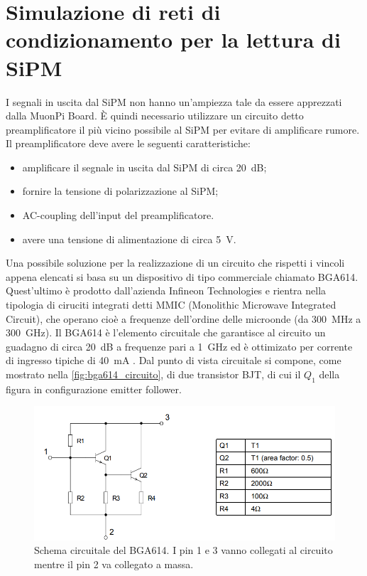 \chapter[Simulazione del preamplificatore]{Simulazione di reti di condizionamento per la lettura di SiPM}
I segnali in uscita dal SiPM non hanno un'ampiezza tale da essere apprezzati dalla MuonPi Board. È quindi necessario utilizzare un circuito detto 
preamplificatore il più vicino possibile al SiPM per evitare di amplificare rumore. Il preamplificatore deve avere le seguenti caratteristiche:
\begin{itemize}
    \item amplificare il segnale in uscita dal SiPM di circa \SI{20}{\dB};
    \item fornire la tensione di polarizzazione al SiPM;
    \item AC-coupling dell'input del preamplificatore.
    \item avere una tensione di alimentazione di circa \SI{5}{\volt}.
\end{itemize}\cite{muonpiwikicontributors_2017_sipm}
Una possibile soluzione per la realizzazione di un circuito che rispetti i vincoli appena elencati si basa su un dispositivo di tipo commerciale chiamato 
BGA614. Quest'ultimo è prodotto dall'azienda Infineon Technologies e rientra nella tipologia di ciruciti integrati detti MMIC (Monolithic 
Microwave Integrated Circuit), che operano cioè a frequenze dell'ordine delle microonde (da \SI{300}{\mega\hertz} a \SI{300}{\giga\hertz}). 
Il BGA614 è l'elemento circuitale che garantisce al circuito un guadagno di circa \SI{20}{\dB} a frequenze pari a \SI{1}{\giga\hertz} ed è 
ottimizato per corrente di ingresso tipiche di \SI{40}{\milli\ampere} \cite{infineontechnologiesag_2011_bga614}. Dal punto di vista circuitale si compone, come mostrato nella 
\autoref*{fig:bga614_circuito}, di due transistor BJT, di cui il $Q_1$ della figura in configurazione emitter follower.
\begin{figure}[h!]
    \centering
    \includegraphics[width=1\linewidth]{img/bga614_circuito.png}
    \caption{Schema circuitale del BGA614. I pin 1 e 3 vanno collegati al circuito mentre il pin 2 va collegato a massa.}
    \label{fig:bga614_circuito}
\end{figure}
